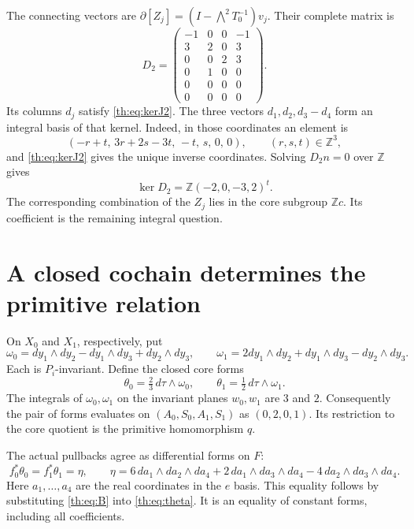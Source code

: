 The connecting vectors are
$\partial[Z_j]=(I-\bigwedge^2T_0^{-1})v_j$.
Their complete matrix is
\begin{equation}\label{th:eq:D}
D_2=
\begin{pmatrix}
-1&0&0&-1\\3&2&0&3\\0&0&2&3\\
0&1&0&0\\0&0&0&0\\0&0&0&0
\end{pmatrix}.
\end{equation}
Its columns $d_j$ satisfy \eqref{th:eq:kerJ2}.
The three vectors $d_1,d_2,d_3-d_4$ form an integral basis of that kernel.
Indeed, in those coordinates an element is
\[
(-r+t,\,3r+2s-3t,\,-t,\,s,\,0,\,0),
\qquad (r,s,t)\in\mathbb Z^3,
\]
and \eqref{th:eq:kerJ2} gives the unique inverse coordinates.
Solving $D_2n=0$ over $\mathbb Z$ gives
\begin{equation}\label{th:eq:r}
\ker D_2=\mathbb Z(-2,0,-3,2)^t.
\end{equation}
The corresponding combination of the $Z_j$ lies in the core subgroup $\mathbb Zc$.
Its coefficient is the remaining integral question.

\section{A closed cochain determines the primitive relation}

On $X_0$ and $X_1$, respectively, put
\[
\omega_0=dy_1\wedge dy_2-dy_1\wedge dy_3+dy_2\wedge dy_3,\qquad
\omega_1=2dy_1\wedge dy_2+dy_1\wedge dy_3-dy_2\wedge dy_3.
\]
Each is $P_i$-invariant.
Define the closed core forms
\begin{equation}\label{th:eq:theta}
\theta_0=\tfrac23\,d\tau\wedge\omega_0,\qquad
\theta_1=\tfrac12\,d\tau\wedge\omega_1.
\end{equation}
The integrals of $\omega_0,\omega_1$ on the invariant planes $w_0,w_1$
are $3$ and $2$.
Consequently the pair of forms evaluates on
$(A_0,S_0,A_1,S_1)$ as $(0,2,0,1)$.
Its restriction to the core quotient is the primitive homomorphism $q$.

The actual pullbacks agree as differential forms on $F$:
\begin{equation}\label{th:eq:eta}
f_0^*\theta_0=f_1^*\theta_1=\eta,\qquad
\eta=6\,da_1\wedge da_2\wedge da_4
 +2\,da_1\wedge da_3\wedge da_4
 -4\,da_2\wedge da_3\wedge da_4.
\end{equation}
Here $a_1,\ldots,a_4$ are the real coordinates in the $e$ basis.
This equality follows by substituting \eqref{th:eq:B} into \eqref{th:eq:theta}.
It is an equality of constant forms, including all coefficients.

